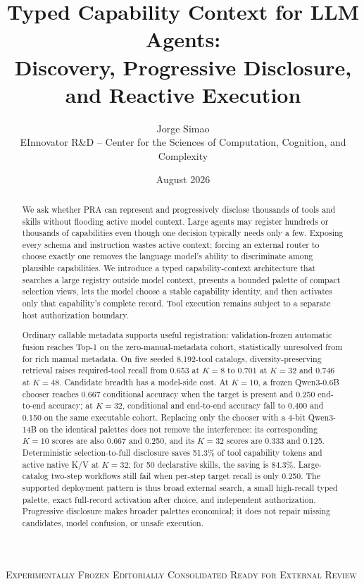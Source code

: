 \documentclass[11pt]{article}
\title{Typed Capability Context for LLM Agents:\\
Discovery, Progressive Disclosure, and Reactive Execution}
\author{Jorge Simao\\EInnovator R\&D -- Center for the Sciences of Computation, Cognition, and Complexity}
\date{August 2026}
\begin{document}
\maketitle
\begin{center}
\small\textsc{Experimentally Frozen}\quad
\textsc{Editorially Consolidated}\quad
\textsc{Ready for External Review}
\end{center}

\begin{abstract}
We ask whether PRA can represent and progressively disclose thousands of tools
and skills without flooding active model context. Large agents may register
hundreds or thousands of capabilities even though
one decision typically needs only a few. Exposing every schema and instruction
wastes active context; forcing an external router to choose exactly one removes
the language model's ability to discriminate among plausible capabilities. We
introduce a typed capability-context architecture that searches a large
registry outside model context, presents a bounded palette of compact selection
views, lets the model choose a stable capability identity, and then activates
only that capability's complete record. Tool execution remains subject to a
separate host authorization boundary.

Ordinary callable metadata supports useful registration: validation-frozen
automatic fusion reaches \PaperSixFiveAblationAutoTopOne{} Top-1 on the
zero-manual-metadata cohort, statistically unresolved from
\PaperSixFiveAblationManualTopOne{} for rich manual metadata. On five seeded
8,192-tool catalogs, diversity-preserving retrieval raises required-tool recall
from 0.653 at $K=8$ to 0.701 at $K=32$ and 0.746 at $K=48$. Candidate breadth
has a model-side cost. At $K=10$, a frozen Qwen3-0.6B chooser reaches 0.667
conditional accuracy when the target is present and 0.250 end-to-end accuracy;
at $K=32$, conditional and end-to-end accuracy fall to 0.400 and 0.150 on the
same executable cohort. Replacing only the chooser with a 4-bit Qwen3-14B on
the identical palettes does not remove the interference: its corresponding
$K=10$ scores are also 0.667 and 0.250, and its $K=32$ scores are 0.333 and
0.125. Deterministic selection-to-full disclosure saves 51.3\%
of tool capability tokens and active native K/V at $K=32$; for 50 declarative
skills, the saving is 84.3\%. Large-catalog two-step workflows still fail when
per-step target recall is only 0.250. The supported deployment pattern is thus
broad external search, a small high-recall typed palette, exact full-record
activation after choice, and independent authorization. Progressive disclosure
makes broader palettes economical; it does not repair missing candidates,
model confusion, or unsafe execution.
\end{abstract}
\end{document}
